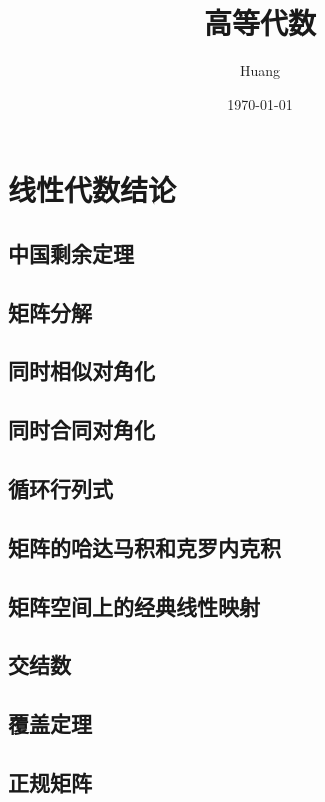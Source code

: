 \documentclass[lang=cn,10pt,thmcnt=section]{elegantbook}
\title{高等代数}
\author{Huang}
\date{\today}
\begin{document}
	
	\maketitle
	\frontmatter
	
	\tableofcontents
	
	\mainmatter

\chapter{线性代数结论}

\section{中国剩余定理}

\section{矩阵分解}

\section{同时相似对角化}

\section{同时合同对角化}

\section{循环行列式}

\section{矩阵的哈达马积和克罗内克积}

\section{矩阵空间上的经典线性映射}

\section{交结数}

\section{覆盖定理}

\section{正规矩阵}
\end{document}
